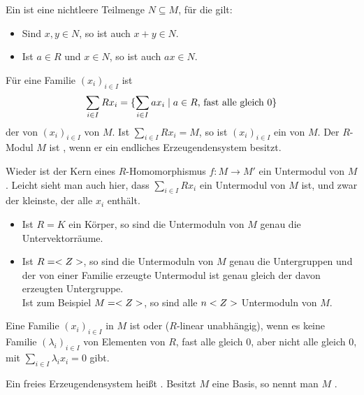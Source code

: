 \begin{definition}
	Ein  ist eine nichtleere Teilmenge $N\subseteq M$, für die gilt:
	\begin{itemize}
		\item Sind $x,y\in N$, so ist auch $x+y\in N$.
		\item Ist $a\in R$ und $x\in N$, so ist auch $ax\in N$.
	\end{itemize}

	Für eine Familie $(x_i)_{i\in I}$ ist
	\begin{align}
		\sum_{i\in I} Rx_i=\{\sum_{i\in I} ax_i\mid a\in R\text{, fast alle gleich 0}\}\notag
	\end{align}
	der von $(x_i)_{i\in I}$  von $M$. Ist $\sum_{i\in I} Rx_i=M$, so ist $(x_i)_{i\in I}$ ein  von $M$. Der $R$-Modul $M$ ist , wenn er ein endliches Erzeugendensystem besitzt.
\end{definition}

\begin{remark}
	Wieder ist der Kern eines $R$-Homomorphismus $f:M\to M'$ ein Untermodul von $M$. Leicht sieht man auch hier, dass $\sum_{i\in I} Rx_i$ ein Untermodul von $M$ ist, und zwar der kleinste, der alle $x_i$ enthält.
\end{remark}

\begin{example}
	\begin{itemize}
		\item Ist $R=K$ ein Körper, so sind die Untermoduln von $M$ genau die Untervektorräume.
		\item Ist $R=<Z>$, so sind die Untermoduln von $M$ genau die Untergruppen und der von einer Familie erzeugte Untermodul ist genau gleich der davon erzeugten Untergruppe. \\
		Ist zum Beispiel $M=<Z>$, so sind alle $n<Z>$ Untermoduln von $M$.
	\end{itemize}
\end{example}

\begin{definition}
	Eine Familie $(x_i)_{i\in I}$ in $M$ ist  oder ($R$-linear unabhängig), wenn es keine Familie $(\lambda_i)_{i\in I}$ von Elementen von $R$, fast alle gleich 0, aber nicht alle gleich 0, mit $\sum_{i\in I} \lambda_ix_i=0$ gibt.
	
	Ein freies Erzeugendensystem heißt . Besitzt $M$ eine Basis, so nennt man $M$ .
\end{definition}

